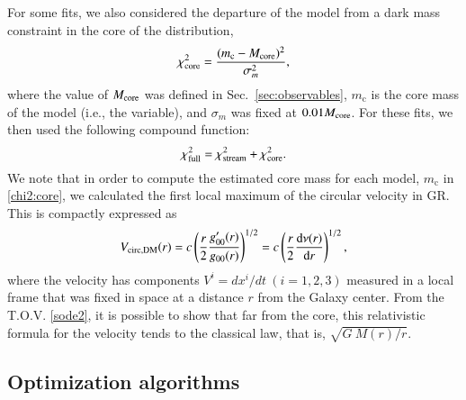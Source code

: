 \documentclass[twocolumn]{aa}
\begin{document}
For some fits, we also considered the departure of the model from a dark mass constraint in the core
of the distribution,
\begin{equation}
   \label{chi2:core}
\chi^2_{\rm{core}}=\frac{(m_\mathrm{c}-M_{\rm{core}})^2}{\sigma_m^2},
\end{equation}
where the value of $M_{\rm{core}}$ was defined in Sec.~\ref{sec:observables}, $m_\mathrm{c}$ is the core mass of the model (i.e., the variable), and
$\sigma_m$ was fixed at $0.01 M_{\rm{core}}$.
For these fits, we then used the following compound function:
\begin{equation}
   \label{chi2:full}
\chi^2_{\rm{full}}=\chi^2_{\rm{stream}}+\chi^2_{\rm{core}}.
\end{equation}
We note that in order to compute the estimated core mass for each model, $m_\mathrm{c}$ in \cref{chi2:core}, we calculated the first local maximum of the circular velocity in GR. This is compactly expressed as
\begin{equation}
   \label{v_circ_dm}
   V_{\rm{circ, DM}}(r)= c\left(\frac{r}{2}\frac{g_{00}'(r)}{g_{00}(r)}\right)^{1/2} =
                        c\left(\frac{r}{2}\frac{\mathrm{d}\nu(r)}{\mathrm{d}r}\right)^{1/2},
\end{equation}
where the velocity has components $V^i=dx^i/dt~(i=1,2,3)$ measured in a local frame that was fixed in space at a distance $r$ from the Galaxy center. From the T.O.V. \cref{sode2}, it is possible to show that far from the core, this relativistic formula for the velocity tends to the classical law, that is, $\sqrt{G~M(r)/r}$.

\subsection{Optimization algorithms}
\label{sec:optimization}
\end{document}
